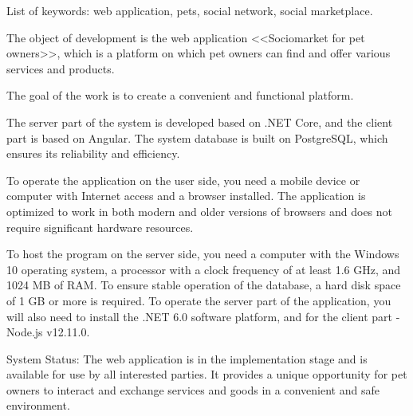List of keywords: web application, pets, social network, social marketplace.

The object of development is the web application <<Sociomarket for pet owners>>, which is a platform on which pet owners can find and offer various services and products.

The goal of the work is to create a convenient and functional platform.

The server part of the system is developed based on .NET Core, and the client part is based on Angular. The system database is built on PostgreSQL, which ensures its reliability and efficiency.

To operate the application on the user side, you need a mobile device or computer with Internet access and a browser installed. The application is optimized to work in both modern and older versions of browsers and does not require significant hardware resources.

To host the program on the server side, you need a computer with the Windows 10 operating system, a processor with a clock frequency of at least 1.6 GHz, and 1024 MB of RAM. To ensure stable operation of the database, a hard disk space of 1 GB or more is required. To operate the server part of the application, you will also need to install the .NET 6.0 software platform, and for the client part -\- Node.js v12.11.0.

System Status: The web application is in the implementation stage and is available for use by all interested parties. It provides a unique opportunity for pet owners to interact and exchange services and goods in a convenient and safe environment.

